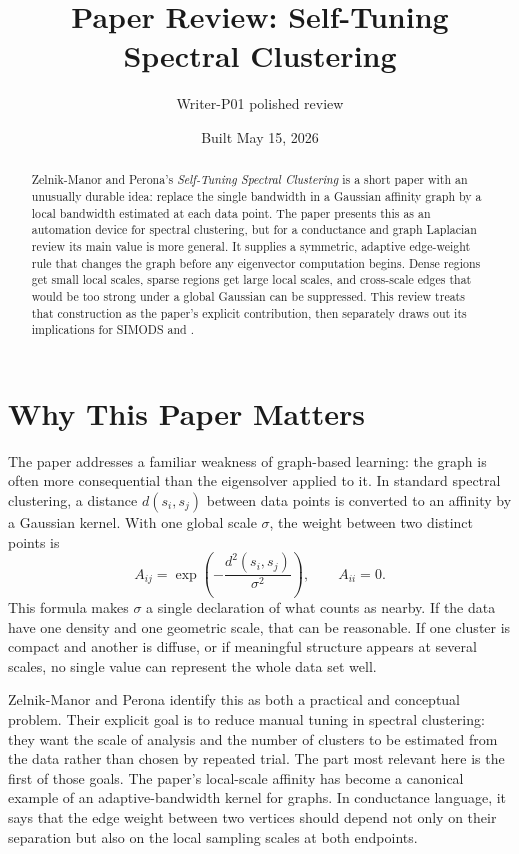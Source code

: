 \documentclass[11pt]{article}
\title{Paper Review: Self-Tuning Spectral Clustering}
\author{Writer-P01 polished review}
\date{Built May 15, 2026}
\begin{document}
\maketitle

\begin{abstract}
Zelnik-Manor and Perona's \emph{Self-Tuning Spectral Clustering}
\citep{zelnikmanor2004selftuning} is a short paper with an unusually durable
idea: replace the single bandwidth in a Gaussian affinity graph by a local
bandwidth estimated at each data point. The paper presents this as an
automation device for spectral clustering, but for a conductance and graph
Laplacian review its main value is more general. It supplies a symmetric,
adaptive edge-weight rule that changes the graph before any eigenvector
computation begins. Dense regions get small local scales, sparse regions get
large local scales, and cross-scale edges that would be too strong under a
global Gaussian can be suppressed. This review treats that construction as the
paper's explicit contribution, then separately draws out its implications for
SIMODS and .
\end{abstract}

\section{Why This Paper Matters}

The paper addresses a familiar weakness of graph-based learning: the graph is
often more consequential than the eigensolver applied to it. In standard
spectral clustering, a distance \(d(s_i,s_j)\) between data points is converted
to an affinity by a Gaussian kernel. With one global scale \(\sigma\), the
weight between two distinct points is
\[
  A_{ij} =
  \exp\left(-\frac{d^2(s_i,s_j)}{\sigma^2}\right), \qquad A_{ii}=0.
\]
This formula makes \(\sigma\) a single declaration of what counts as nearby.
If the data have one density and one geometric scale, that can be reasonable.
If one cluster is compact and another is diffuse, or if meaningful structure
appears at several scales, no single value can represent the whole data set
well.

Zelnik-Manor and Perona identify this as both a practical and conceptual
problem. Their explicit goal is to reduce manual tuning in spectral
clustering: they want the scale of analysis and the number of clusters to be
estimated from the data rather than chosen by repeated trial. The part most
relevant here is the first of those goals. The paper's local-scale affinity
has become a canonical example of an adaptive-bandwidth kernel for graphs. In
conductance language, it says that the edge weight between two vertices should
depend not only on their separation but also on the local sampling scales at
both endpoints.
\end{document}
